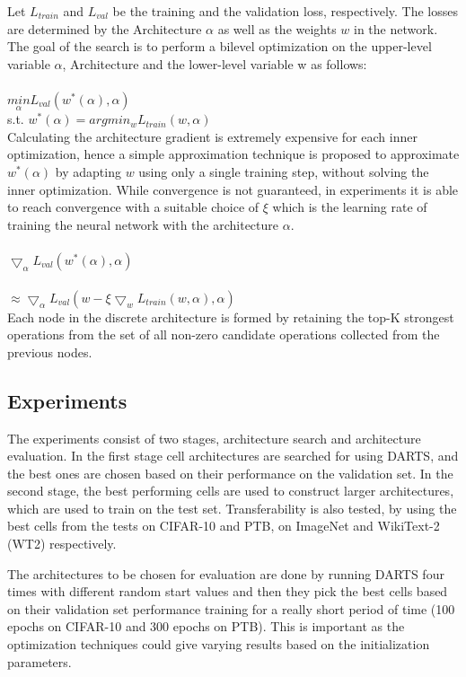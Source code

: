 \documentclass{ieee}
\begin{document}
Let $L_{train}$ and $L_{val}$ be the training and the validation loss, respectively. The losses are determined by the Architecture $\alpha$ as well as the weights $w$ in the network. The goal of the search is to perform a bilevel optimization on the upper-level variable $\alpha$, Architecture  and the lower-level variable w as follows:\\ \\
$\underset{\alpha}{min}  L_{val}(w^*(\alpha), \alpha)$ \\ 

s.t. $ w^* (\alpha) = argmin_w L_{train}(w, \alpha)$ \\

Calculating the architecture gradient is extremely expensive for each inner optimization, hence a simple approximation technique is proposed to approximate $ w^*( \alpha ) $ by adapting $w$ using only a single training step, without solving the inner optimization. While convergence is not guaranteed, in experiments it is able to reach convergence with a suitable choice of $\xi$ which is the learning rate of training the neural network with the architecture $\alpha$. \\ \\
$\bigtriangledown_\alpha L_{val}(w^*(\alpha), \alpha)$ \\ \\ 
$\approx \bigtriangledown_\alpha L_{val}(w - \xi \bigtriangledown_w L_{train}(w, \alpha), \alpha)$ \\

Each node in the discrete architecture is formed by retaining the top-K strongest operations from the set of all non-zero candidate operations collected from the previous nodes.

\subsection{Experiments}
The experiments consist of two stages, architecture search and architecture evaluation. In the first stage cell architectures are searched for using DARTS, and the best ones are chosen based on their performance on the validation set. In the second stage, the best performing cells are used to construct larger architectures, which are used to train on the test set. Transferability is also tested, by using the best cells from the tests on CIFAR-10 and PTB, on ImageNet and WikiText-2 (WT2) respectively.

The architectures to be chosen for evaluation are done by running DARTS four times with different random start values and then they pick the best cells based on their validation set performance training for a really short period of time (100 epochs on CIFAR-10 and 300 epochs on PTB). This is important as the optimization techniques could give varying results based on the initialization parameters.
\end{document}
